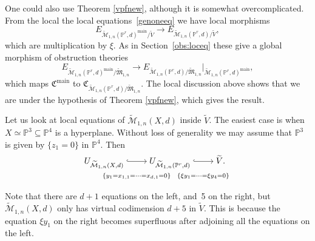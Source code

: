 \documentclass[pdftex]{sigma}
\numberwithin{equation}{section}
\newcommand{\PP}{\mathbb P}
\begin{document}
\begin{Example}
One could also use Theorem \ref{vpfnew}, although it is somewhat overcomplicated. From the local the local equations~\eqref{genoneeq} we have local morphisms
\[ E_{\widetilde{\mathcal{M}}_{1,n}(\PP^r,d)^{\mathrm{main}}/\widetilde{V}}\to E_{\widetilde{\mathcal{M}}_{1,n}(\PP^r,d)/\widetilde{V}},
\]
which are multiplication by $\xi$. As in Section~\ref{obs:loceq} these give a global morphism of obstruction theories
\[
E_{\widetilde{\mathcal{M}}_{1,n}(\PP^r,d)^{\mathrm{main}}/\widetilde{\mathfrak{M}}_{1,n}}\to E_{\widetilde{\mathcal{M}}_{1,n}(\PP^r,d)/\widetilde{\mathfrak{M}}_{1,n}}|_{\widetilde{\mathcal{M}}_{1,n} (\PP^r,d)^{\mathrm{main}}},
\]
which maps $\mathfrak{C}^{\mathrm{main}}$ to $\mathfrak{C}_{\widetilde{\mathcal{M}}_{1,n}(\PP^r,d)/\widetilde{\mathfrak{M}}_{1,n}}$. The local discussion above shows that we are under the hypothesis of Theorem \ref{vpfnew}, which gives the result.
\end{Example}


\begin{Example} Let us look at local equations of $\widetilde{\mathcal{M}}_{1,n}(X,d)$ inside $\widetilde{V}$. The easiest case is when $X\simeq \mathbb P^3\subseteq \mathbb P^4$ is a hyperplane. Without loss of generality we may assume that $\mathbb P^3$ is given by $\{z_1=0\}$ in $\PP^4$. Then
\begin{equation}\label{depeq}
 \begin{tikzcd}[cramped]
 U_{\widetilde{\mathcal{M}}_{1,n}(X,d)} \ar[r,hook,"\{y_1=x_{1,1}=\dots=x_{d,1}=0\}" below=.4cm] & U_{\widetilde{\mathcal{M}}_{1,n}(\PP^r,d)} \ar[r,hook," \{\xi y_1=\dots=\xi y_4=0\} " below=.4cm] & \widetilde{V}.
 \end{tikzcd}
\end{equation}

Note that there are $d+1$ equations on the left, and~5 on the right, but $\widetilde{\mathcal{M}}_{1,n}(X,d)$ only has virtual codimension $d+5$ in $\widetilde{V}$. This is because the equation $\xi y_1$ on the right becomes superfluous after adjoining all the equations on the left.
\end{Example}
\end{document}
